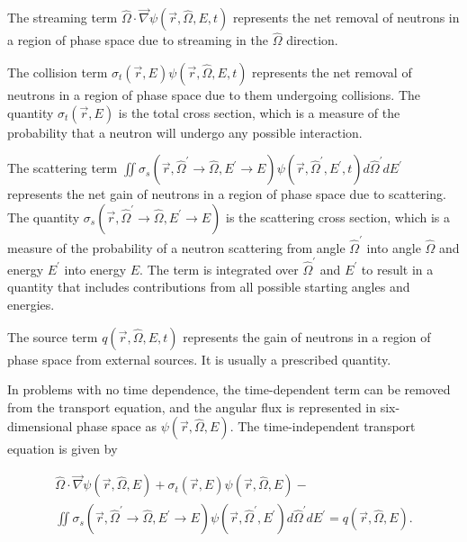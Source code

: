 The streaming term $\hat{\Omega}\cdot\vec{\nabla}\psi\left(\vec{r},\hat{\Omega},E,t\right)$
represents the net removal of neutrons in a region of phase space due to streaming in the $\hat{\Omega}$ direction.

The collision term $\sigma_t\left(\vec{r},E\right)\psi\left(\vec{r},\hat{\Omega},E,t\right)$
represents the net removal of neutrons in a region of phase space due to them undergoing collisions.
The quantity $\sigma_t\left(\vec{r},E\right)$ is the total cross section, which is a measure of the probability that a neutron will undergo any possible interaction.

The scattering term $\iint\sigma_s\left(\vec{r},\hat{\Omega}^\prime\rightarrow\hat{\Omega},E^\prime\rightarrow E\right)\psi\left(\vec{r},\hat{\Omega}^\prime,E^\prime,t\right)d\hat{\Omega}^\prime dE^\prime$
represents the net gain of neutrons in a region of phase space due to scattering.
The quantity $\sigma_s\left(\vec{r},\hat{\Omega}^\prime\rightarrow\hat{\Omega},E^\prime\rightarrow E\right)$ is the scattering cross section,
which is a measure of the probability of a neutron scattering from angle $\hat{\Omega}^\prime$ into angle ${\hat{\Omega}}$ and energy $E^\prime$ into energy $E$.
The term is integrated over $\hat{\Omega}^\prime$ and $E^\prime$ to result in a quantity that includes contributions from all possible starting angles and energies.

The source term $q\left(\vec{r},\hat{\Omega},E,t\right)$
represents the gain of neutrons in a region of phase space from external sources.
It is usually a prescribed quantity.

In problems with no time dependence, the time-dependent term can be removed from the transport equation,
and the angular flux is represented in six-dimensional phase space as $\psi\left(\vec{r},\hat{\Omega},E\right)$.
The time-independent transport equation is given by

\begin{multline}\label{eq:bg:transport}
  \hat{\Omega}\cdot\vec{\nabla}\psi\left(\vec{r},\hat{\Omega},E\right) +
  \sigma_t\left(\vec{r},E\right)\psi\left(\vec{r},\hat{\Omega},E\right) - \\
  \iint\sigma_s\left(\vec{r},\hat{\Omega}^\prime\rightarrow\hat{\Omega},E^\prime\rightarrow E\right)\psi\left(\vec{r},\hat{\Omega}^\prime,E^\prime\right)d\hat{\Omega}^\prime dE^\prime =
  q\left(\vec{r},\hat{\Omega},E\right).
\end{multline}


